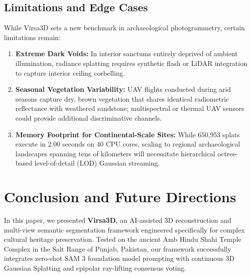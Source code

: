 \documentclass[11pt,a4paper]{article}
\begin{document}
\subsection{Limitations and Edge Cases}
While Virsa3D sets a new benchmark in archaeological photogrammetry, certain limitations remain:
\begin{enumerate}
    \item \textbf{Extreme Dark Voids:} In interior sanctums entirely deprived of ambient illumination, radiance splatting requires synthetic flash or LiDAR integration to capture interior ceiling corbelling.
    \item \textbf{Seasonal Vegetation Variability:} UAV flights conducted during arid seasons capture dry, brown vegetation that shares identical radiometric reflectance with weathered sandstone; multispectral or thermal UAV sensors could provide additional discriminative channels.
    \item \textbf{Memory Footprint for Continental-Scale Sites:} While 650,953 splats execute in 2.00 seconds on 40 CPU cores, scaling to regional archaeological landscapes spanning tens of kilometers will necessitate hierarchical octree-based level-of-detail (LOD) Gaussian streaming.
\end{enumerate}

\section{Conclusion and Future Directions}
\label{sec:conclusion}

In this paper, we presented \textbf{Virsa3D}, an AI-assisted 3D reconstruction and multi-view semantic segmentation framework engineered specifically for complex cultural heritage preservation. Tested on the ancient Amb Hindu Shahi Temple Complex in the Salt Range of Punjab, Pakistan, our framework successfully integrates zero-shot SAM 3 foundation model prompting with continuous 3D Gaussian Splatting and epipolar ray-lifting consensus voting. 
\end{document}
